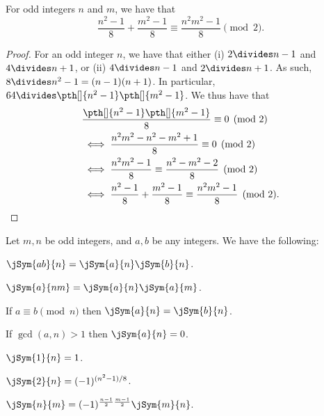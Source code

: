 
\begin{lemma}    
    For odd integers $n$ and $m$, we have that
    \[
        \frac{n^2 -1 }{8} + \frac{m^2 -1 }{8} %
        \equiv \frac{n^2m^2 -1 }{8} \pmod{2}.
    \]
\end{lemma}
\begin{proof}
    For an odd integer $n$, we have that either (i) $2\divides n-1$
    and $4 \divides n+1$, or (ii) $4\divides n-1$ and $2 \divides
    n+1$. As such, $8 \divides n^2 - 1 = (n-1)(n+1)$. In particular,
    $64 \divides \pth[]{n^2 - 1 } \pth[]{m^2 -1}$. We thus have that 
    \begin{align*}
        &\frac{\pth[]{n^2 -1}\pth[]{m^2 - 1}}{8} \equiv 0 \pmod{2} \\
        &\iff%
        \frac{n^2 m^2 - n^2 - m^2 +1}{8} \equiv 0 \pmod{2}%
        \\&\iff%
        \frac{n^2 m^2 -1}{8} \equiv \frac{n^2 -m^2 -2}{8} \pmod{2}%
        \\&%
        \iff%
        \frac{n^2 -1 }{8} + \frac{m^2 -1 }{8} %
        \equiv \frac{n^2m^2 -1 }{8} \pmod{2}.
    \end{align*}
\end{proof}

\begin{lemma}
    Let $m, n$ be odd integers, and $a,b$ be any integers. We have the
    following:
    \begin{compactenumA}
        \item {}%
        $\jSym{a b}{n} = \jSym{a}{n} \jSym{b}{n}$.

        \item $\jSym{a}{nm} = \jSym{a}{n} \jSym{a}{m}$.

        \item {} If $a \equiv b \pmod{n}$ then
        $\jSym{a }{n} = \jSym{b}{n}$.
    
        \item {}  If $\gcd(a,n) > 1$ then $\jSym{a}{n} = 0$.

        \item $\jSym{1}{n}  =1$.
        
        \item {}%
        $\jSym{2}{n} =(-1)^{(n^2 - 1)/8}$.
    
        \item
        $\jSym{n}{m} = (-1)^{\frac{n-1}{2} \frac{m-1}{2}} \jSym{m}{n}$.
    \end{compactenumA}
\end{lemma}

